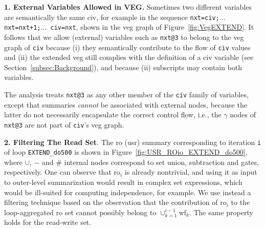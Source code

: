 \documentclass{sig-alternate}
\begin{document}
{\bf 1. External Variables Allowed in VEG.}
%
Sometimes two different variables are semantically the same {\sc civ},
for example in the sequence {\tt nxt=civ;$\ldots$ nxt=nxt+1;$\ldots$ civ=nxt},
shown in the {\sc veg} graph of Figure~\ref{fig:VegEXTEND}. 
It follows that we allow (external) variables such as {\tt nxt@3} to belong to
the {\sc veg} graph of {\tt civ} because (i) they semantically contribute to 
the flow of {\tt civ} values and (ii) the extended {\sc veg} still complies 
with the definition of a {\sc civ} variable (see Section~\ref{subsec:Background}), 
and because (ii) subscripts may contain both variables.  

%
The analysis treats {\tt nxt@3} as any other member of the {\tt civ} family of 
variables, except that summaries {\em cannot} be associated with external nodes,
because the latter do not necessarily encapsulate the correct control flow,
i.e., the $\gamma$ nodes of {\tt nxt@3} are not part of {\tt civ}'s {\sc veg} graph.

\vspace{1ex}

{\bf 2. Filtering The Read Set}. The {\sc ro} ({\sc usr}) summary corresponding 
to iteration {\tt i} of loop {\tt EXTEND\_do500} is shown in 
Figure~\ref{fig:USR_ROio_EXTEND_do500}, where $\cup$, $-$ and $\#$ internal nodes 
correspond to set union, subtraction and gates, respectively.   
One can observe that {\sc ro}$_{i}$ is already nontrivial, and using it as
input to outer-level summarization would result in complex set expressions,
which would be ill-suited for computing independence, for example.
%
%
We use instead a filtering technique based on the observation that
the contribution of {\sc ro}$_i$ to the loop-aggregated
{\sc ro} set cannot possibly belong to $\cup_{k=1}^{i-1}${\sc wf}$_k$.
The same property holds for the read-write set.
\end{document}

